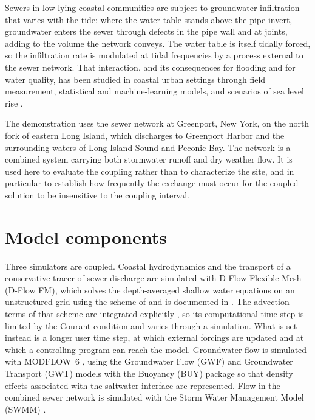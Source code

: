 \documentclass[preprint,authoryear,11pt]{elsarticle}
\begin{document}
Sewers in low-lying coastal communities are subject to groundwater infiltration that varies with the tide: where the water table stands above the pipe invert, groundwater enters the sewer through defects in the pipe wall and at joints, adding to the volume the network conveys. The water table is itself tidally forced, so the infiltration rate is modulated at tidal frequencies by a process external to the sewer network. That interaction, and its consequences for flooding and for water quality, has been studied in coastal urban settings through field measurement, statistical and machine-learning models, and scenarios of sea level rise \citep{liu2018gwsewer, su2019infiltration, liu2021predicting, su2022slr}.

The demonstration uses the sewer network at Greenport, New York, on the north fork of eastern Long Island, which discharges to Greenport Harbor and the surrounding waters of Long Island Sound and Peconic Bay. The network is a combined system carrying both stormwater runoff and dry weather flow. It is used here to evaluate the coupling rather than to characterize the site, and in particular to establish how frequently the exchange must occur for the coupled solution to be insensitive to the coupling interval.

\section{Model components}

Three simulators are coupled. Coastal hydrodynamics and the transport of a conservative tracer of sewer discharge are simulated with D-Flow Flexible Mesh (D-Flow FM), which solves the depth-averaged shallow water equations on an unstructured grid using the scheme of \cite{kernkamp2011unstructured} and is documented in \cite{deltares2026dflowfm}. The advection terms of that scheme are integrated explicitly \citep{kernkamp2011unstructured}, so its computational time step is limited by the Courant condition and varies through a simulation. What is set instead is a longer user time step, at which external forcings are updated and at which a controlling program can reach the model. Groundwater flow is simulated with MODFLOW~6 \citep{langevin2017modflow6}, using the Groundwater Flow (GWF) and Groundwater Transport (GWT) models with the Buoyancy (BUY) package so that density effects associated with the saltwater interface are represented. Flow in the combined sewer network is simulated with the Storm Water Management Model (SWMM) \citep{rossman2022swmm}.
\end{document}
